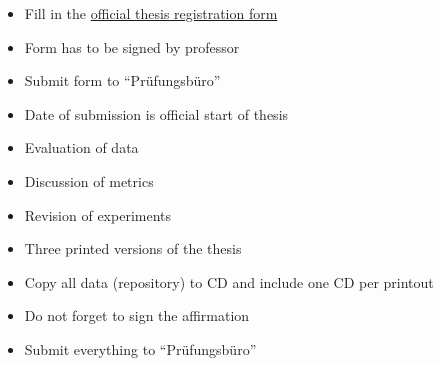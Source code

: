         \begin{itemize}
        	\item Fill in the \href{http://www.inf.fu-berlin.de/stud/inf-stud/anmeldung/}{official thesis registration form}
        	\item Form has to be signed by professor
        	\item Submit form to ``Pr\"ufungsb\"uro''
        	\item Date of submission is official start of thesis
        \end{itemize}

        \begin{itemize}
            \item Evaluation of data
            \item Discussion of metrics
            \item Revision of experiments
        \end{itemize}


        \begin{itemize}
        	\item Three printed versions of the thesis
        	\item Copy all data (repository) to CD and include one CD per printout
        	\item Do not forget to sign the affirmation
        	\item Submit everything to ``Pr\"ufungsb\"uro''
        \end{itemize}



